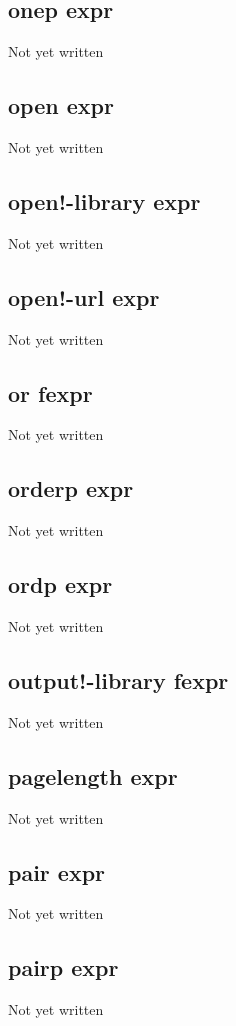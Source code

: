 \documentclass[a4paper,11pt]{article}
\begin{document}
{\subsection{\ttfamily onep expr}
Not yet written

\subsection{\ttfamily open expr}
Not yet written

\subsection{\ttfamily open!-library expr}
Not yet written

\subsection{\ttfamily open!-url expr}
Not yet written

\subsection{\ttfamily or fexpr}
Not yet written

\subsection{\ttfamily orderp expr}
Not yet written

\subsection{\ttfamily ordp expr}
Not yet written

\subsection{\ttfamily output!-library fexpr}
Not yet written

\subsection{\ttfamily pagelength expr}
Not yet written

\subsection{\ttfamily pair expr}
Not yet written

\subsection{\ttfamily pairp expr}
Not yet written

}
\end{document}
